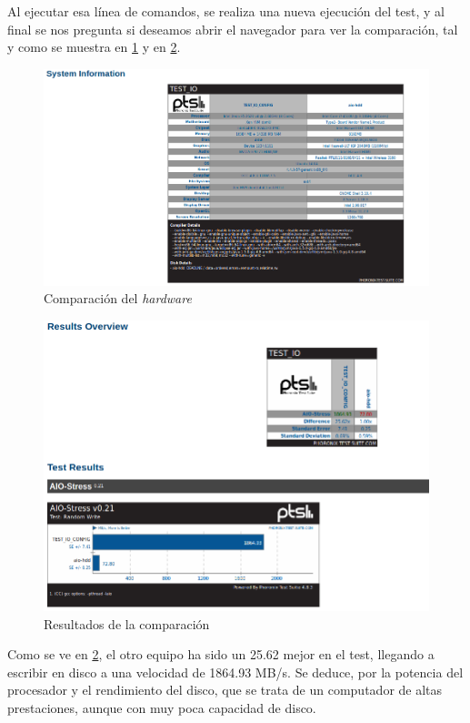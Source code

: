 Al ejecutar esa línea de comandos, se realiza una nueva ejecución del test, y al final se nos pregunta si deseamos abrir el navegador para ver la comparación, tal y como se muestra en \ref{cuestion1-10} y en \ref{cuestion1-11}.

\begin{figure}[H]
	\centering
	\includegraphics[scale=0.5]{cuestion1-10.png}
	\caption{Comparación del \textit{hardware}} \label{cuestion1-10}
\end{figure}

\begin{figure}[H]
	\centering
	\includegraphics[scale=0.4]{cuestion1-11.png}
	\caption{Resultados de la comparación} \label{cuestion1-11}
\end{figure}

Como se ve en \ref{cuestion1-11}, el otro equipo ha sido un 25.62 mejor en el test, llegando a escribir en disco a una velocidad de 1864.93 MB/s. Se deduce, por la potencia del procesador y el rendimiento del disco, que se trata de un computador de altas prestaciones, aunque con muy poca capacidad de disco.

